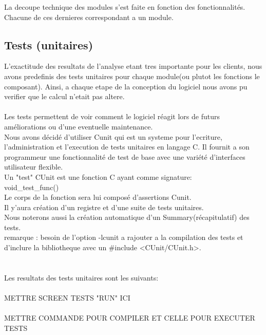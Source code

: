 \documentclass[a4]{article}
\begin{document}
		
		
		

		La decoupe technique des modules s'est faite en fonction des fonctionnalités.
		 Chacune de ces dernieres correspondant a un module.
		
		\subsection{Tests (unitaires)}
		L’exactitude des resultats de l'analyse etant tres importante pour les clients, nous avons predefinis des tests
unitaires pour chaque module(ou plutot les fonctions le composant). Ainsi, a chaque etape de la conception du logiciel
nous avons pu verifier que le calcul n’etait pas altere. \\ \\
Les tests permettent de voir comment le logiciel réagit lors de futurs améliorations ou d'une eventuelle maintenance. \\ 
 
Nous avons décidé d'utiliser Cunit qui est un systeme pour l'ecriture, l'administration et l'execution de tests unitaires
en langage C. Il fournit a son programmeur une fonctionnalité de test de base avec une variété d'interfaces utilisateur flexible.\\
Un "test"  CUnit est une fonction C ayant comme signature:\\
void\_test\_func()\\
Le corps de la fonction sera lui composé d'assertions Cunit.\\
Il y'aura création d'un registre et d'une suite de tests unitaires.\\
Nous noterons aussi la création automatique d'un Summary(récapitulatif) des tests.\\
remarque : besoin de l'option -lcunit a rajouter a la compilation des tests et d'inclure la bibliotheque avec un
\#include <CUnit/CUnit.h>.\\ \\ \\ 

  
Les resultats des tests unitaires sont les suivants:\\ \\ 
METTRE SCREEN TESTS "RUN" ICI \\ \\

		METTRE COMMANDE POUR COMPILER ET CELLE POUR EXECUTER TESTS
\end{document}

